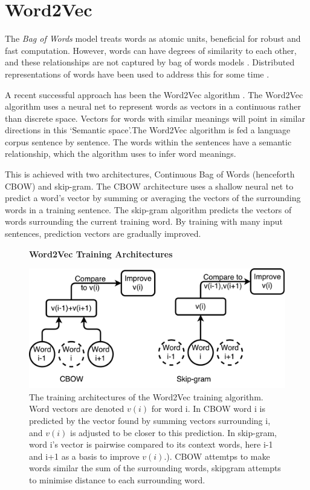 \section{Word2Vec}
\label{sec:WORD2VEC}
The \emph{Bag of Words} model treats words as atomic units, beneficial for robust and fast computation. However, words can have degrees of similarity to each other, and these relationships are not captured by bag of words models \cite{word2veckingqueen}. Distributed representations of words have been used to address this for some time \cite{distributedrepresentations}.

 A recent successful approach has been the Word2Vec algorithm \cite{word2vec1} \cite{word2vec2}. The Word2Vec algorithm uses a neural net to represent words as vectors in a continuous rather than discrete space. Vectors for words with similar meanings will point in similar directions in this `Semantic space'.The Word2Vec algorithm is fed a language corpus sentence by sentence. The words within the sentences have a semantic relationship, which the algorithm uses to infer word meanings. 
 
This is achieved with two architectures, Continuous Bag of Words (henceforth CBOW) and skip-gram. The CBOW architecture uses a shallow neural net to predict a word's vector by summing or averaging the vectors of the surrounding words in a training sentence. The skip-gram algorithm predicts the vectors of words surrounding the current training word. By training with many input sentences, prediction vectors are gradually improved. 

\begin{figure}[H]
    \centering
    \textbf{Word2Vec Training Architectures}\par\medskip
    \includegraphics[width=\textwidth]{Natural_Language_Processing/cbow_v_skip.pdf}
    \caption[Word2Vec Training Architectures ]{The training architectures of the Word2Vec training algorithm. Word vectors are denoted $v(i)$ for word i. In CBOW word i is predicted by the vector found by summing vectors surrounding i, and $v(i)$ is adjusted to be closer to this prediction. In skip-gram, word i's vector is pairwise compared to its context words, here i-1 and i+1 as a basis to improve $v(i)$.). CBOW attemtps to make words similar the sum of the surrounding words, skipgram attempts to minimise distance to each surrounding word.}
     \label{fig:CBOWSKIP}
\end{figure}

